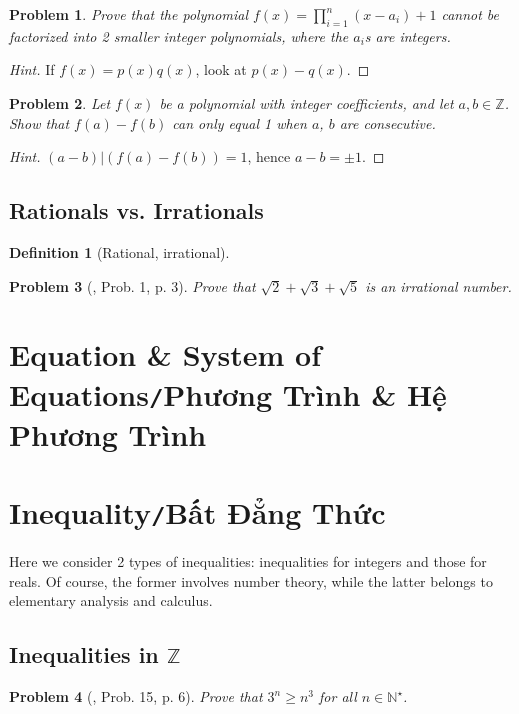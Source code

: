 \documentclass[oneside]{book}
\numberwithin{equation}{section}
\newtheorem{definition}{Definition}[section]
\newtheorem{problem}{Problem}[section]
\begin{document}
\begin{problem}
	Prove that the polynomial $f(x) = \prod_{i=1}^n (x - a_i) + 1$ cannot be factorized into 2 smaller integer polynomials, where the $a_i$s are integers.
\end{problem}

\begin{proof}[Hint]
	If $f(x) = p(x)q(x)$, look at $p(x) - q(x)$.
\end{proof}

\begin{problem}
	Let $f(x)$ be a polynomial with integer coefficients, and let $a,b\in\mathbb{Z}$. Show that $f(a) - f(b)$ can only equal 1 when $a$, $b$ are consecutive.
\end{problem}

\begin{proof}[Hint]
	$(a - b)|(f(a) - f(b)) = 1$, hence $a - b = \pm 1$.
\end{proof}

\subsection{Rationals vs. Irrationals}
\begin{definition}[Rational, irrational]
	
\end{definition}
\begin{problem}[\cite{Gelca_Andreescu2017}, Prob. 1, p. 3]
	Prove that $\sqrt{2} + \sqrt{3} + \sqrt{5}$ is an irrational number.
\end{problem}

\section{Equation \& System of Equations\texttt{/}Phương Trình \& Hệ Phương Trình}

\section{Inequality\texttt{/}Bất Đẳng Thức}
Here we consider 2 types of inequalities: inequalities for integers and those for reals. Of course, the former involves number theory, while the latter belongs to elementary analysis and calculus.

\subsection{Inequalities in $\mathbb{Z}$}
\begin{problem}[\cite{Gelca_Andreescu2017}, Prob. 15, p. 6]
	Prove that $3^n\ge n^3$  for all $n\in\mathbb{N}^\star$.
\end{problem}
\end{document}
